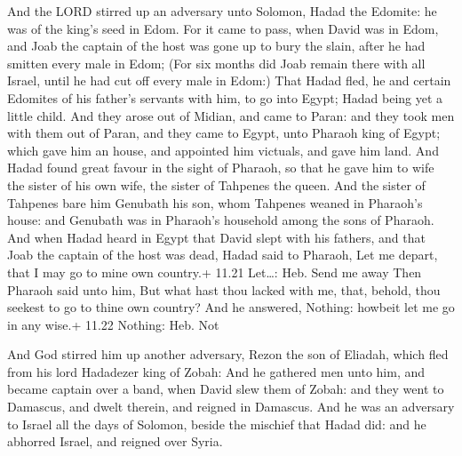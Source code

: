  And the LORD stirred up an adversary unto Solomon, Hadad
the Edomite: he was of the king's seed in Edom.  For it
came to pass, when David was in Edom, and Joab the captain of the host
was gone up to bury the slain, after he had smitten every male in Edom;
 (For six months did Joab remain there with all Israel,
until he had cut off every male in Edom:)  That Hadad fled,
he and certain Edomites of his father's servants with him, to go into
Egypt; Hadad being yet a little child.  And they arose out
of Midian, and came to Paran: and they took men with them out of Paran,
and they came to Egypt, unto Pharaoh king of Egypt; which gave him an
house, and appointed him victuals, and gave him land.  And
Hadad found great favour in the sight of Pharaoh, so that he gave him to
wife the sister of his own wife, the sister of Tahpenes the queen.
 And the sister of Tahpenes bare him Genubath his son, whom
Tahpenes weaned in Pharaoh's house: and Genubath was in Pharaoh's
household among the sons of Pharaoh.  And when Hadad heard
in Egypt that David slept with his fathers, and that Joab the captain of
the host was dead, Hadad said to Pharaoh, Let me depart, that I may go
to mine own country.+ 11.21 Let\ldots: Heb. Send me away 
Then Pharaoh said unto him, But what hast thou lacked with me, that,
behold, thou seekest to go to thine own country? And he answered,
Nothing: howbeit let me go in any wise.+ 11.22 Nothing: Heb. Not

 And God stirred him up another adversary, Rezon the son
of Eliadah, which fled from his lord Hadadezer king of Zobah:
 And he gathered men unto him, and became captain over a
band, when David slew them of Zobah: and they went to Damascus, and
dwelt therein, and reigned in Damascus.  And he was an
adversary to Israel all the days of Solomon, beside the mischief that
Hadad did: and he abhorred Israel, and reigned over Syria.

